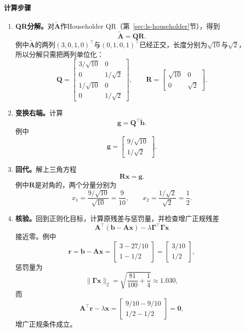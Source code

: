 \paragraph{计算步骤}
\begin{enumerate}
 \item \textbf{QR分解。}对$\tilde{\bm A}$作Householder QR（第~\ref{sec:ls-householder}节），得到
 \[
  \tilde{\bm A}=\bm Q\bm R .
 \]
 例中$\tilde{\bm A}$的两列$(3,0,1,0)^\top$与$(0,1,0,1)^\top$已经正交，长度分别为$\sqrt{10}$与$\sqrt2$，所以分解只需把两列单位化：
 \[
  \bm Q=\begin{bmatrix}3/\sqrt{10}&0\\0&1/\sqrt2\\1/\sqrt{10}&0\\0&1/\sqrt2\end{bmatrix},\qquad
  \bm R=\begin{bmatrix}\sqrt{10}&0\\0&\sqrt2\end{bmatrix}.
 \]

 \item \textbf{变换右端。}计算
 \[
  \bm g=\bm Q^\top\tilde{\bm b} .
 \]
 例中
 \[
  \bm g=\begin{bmatrix}9/\sqrt{10}\\1/\sqrt2\end{bmatrix}.
 \]

 \item \textbf{回代。}解上三角方程
 \[
  \bm R\bm x=\bm g .
 \]
 例中$\bm R$是对角的，两个分量分别为
 \[
  x_1=\frac{9/\sqrt{10}}{\sqrt{10}}=\frac9{10},\qquad
  x_2=\frac{1/\sqrt2}{\sqrt2}=\frac12 .
 \]

 \item \textbf{核验。}回到正则化目标，计算原残差与惩罚量，并检查增广正规残差
 \[
  \bm A^\top(\bm b-\bm A\bm x)-\lambda\bm\Gamma^\top\bm\Gamma\bm x
 \]
 接近零。例中
 \[
  \bm r=\bm b-\bm A\bm x=\begin{bmatrix}3-27/10\\1-1/2\end{bmatrix}=\begin{bmatrix}3/10\\1/2\end{bmatrix},
 \]
 惩罚量为
 \[
  \lVert\bm\Gamma\bm x\rVert_2=\sqrt{\frac{81}{100}+\frac14}\approx1.030 ,
 \]
 而
 \[
  \bm A^\top\bm r-\lambda\bm x=\begin{bmatrix}9/10-9/10\\1/2-1/2\end{bmatrix}=\bm0 ,
 \]
 增广正规条件成立。
\end{enumerate}

